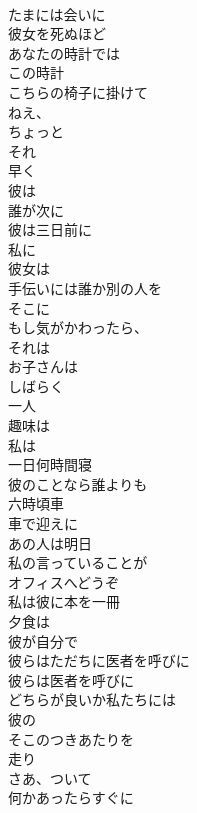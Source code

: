 \documentclass[8pt]{extreport}
\begin{document}
\begin{CJK}{UTF8}{min}
\\	たまには会いに
\\	彼女を死ぬほど
\\	あなたの時計では
\\	この時計
\\	こちらの椅子に掛けて
\\	ねえ、
\\	ちょっと
\\	それ
\\	早く
\\	彼は
\\	誰が次に
\\	彼は三日前に
\\	私に
\\	彼女は
\\	手伝いには誰か別の人を
\\	そこに
\\	もし気がかわったら、
\\	それは
\\	お子さんは
\\	しばらく
\\	一人
\\	趣味は
\\	私は
\\	一日何時間寝 
\\	彼のことなら誰よりも
\\	六時頃車 
\\	車で迎えに
\\	あの人は明日
\\	私の言っていることが
\\	オフィスへどうぞ
\\	私は彼に本を一冊
\\	夕食は
\\	彼が自分で
\\	彼らはただちに医者を呼びに
\\	彼らは医者を呼びに
\\	どちらが良いか私たちには
\\	彼の
\\	そこのつきあたりを
\\	走り
\\	さあ、ついて
\\	何かあったらすぐに
\end{CJK}
\end{document}
